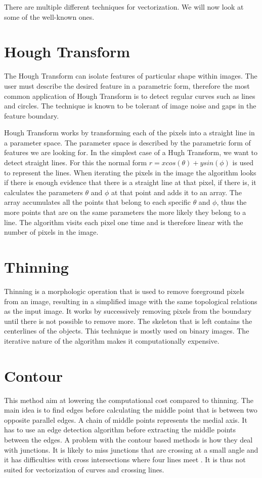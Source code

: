 There are multiple different techniques for vectorization. We will now look at some of the well-known ones.

\section{Hough Transform}
The Hough Transform can isolate features of particular shape within images. The user must describe the desired feature in a parametric form, therefore the most common application of Hough Transform is to detect regular curves such as lines and circles. The technique is known to be tolerant of image noise and gaps in the feature boundary.

Hough Transform works by transforming each of the pixels into a straight line in a parameter space. The parameter space is described by the parametric form of features we are looking for. In the simplest case of a Hugh Transform, we want to detect straight lines. For this the normal form $r = x cos(\theta) + y sin(\phi)$ is used to represent the lines. When iterating the pixels in the image the algorithm looks if there is enough evidence that there is a straight line at that pixel, if there is, it calculates the parameters $\theta$ and $\phi$ at that point and adds it to an array. The array accumulates all the points that belong to each specific $\theta$ and $\phi$, thus the more points that are on the same parameters the more likely they belong to a line. The algorithm visits each pixel one time and is therefore linear with the number of pixels in the image.

\section{Thinning}
Thinning is a morphologic operation that is used to remove foreground pixels from an image, resulting in a simplified image with the same topological relations as the input image. It works by successively removing pixels from the boundary until there is not possible to remove more. The skeleton that is left contains the centerlines of the objects. This technique is mostly used on binary images. The iterative nature of the algorithm makes it computationally expensive.

\section{Contour}
This method aim at lowering the computational cost compared to thinning. The main idea is to find edges before calculating the middle point that is between two opposite parallel edges. A chain of middle points represents the medial axis. It has to use an edge detection algorithm before extracting the middle points between the edges. A problem with the contour based methods is how they deal with junctions. It is likely to miss junctions that are crossing at a small angle and it has difficulties with cross intersections where four lines meet \citet{Wenyin1999}. It is thus not suited for vectorization of curves and crossing lines.


